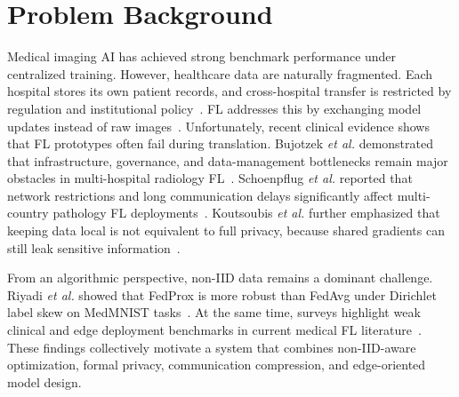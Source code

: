 \section{Problem Background}
Medical imaging AI has achieved strong benchmark performance under centralized
training. However, healthcare data are naturally fragmented. Each hospital
stores its own patient records, and cross-hospital transfer is restricted by
regulation and institutional policy~\cite{guan2024federated}. FL addresses
this by exchanging model updates instead of raw
images~\cite{mcmahan2017communication}. Unfortunately, recent clinical
evidence shows that FL prototypes often fail during translation. Bujotzek
\emph{et al.} demonstrated that infrastructure, governance, and
data-management bottlenecks remain major obstacles in multi-hospital
radiology FL~\cite{bujotzek2024real}. Schoenpflug \emph{et al.} reported
that network restrictions and long communication delays significantly affect
multi-country pathology FL deployments~\cite{schoenpflug2025navigating}.
Koutsoubis \emph{et al.} further emphasized that keeping data local is not
equivalent to full privacy, because shared gradients can still leak sensitive
information~\cite{koutsoubis2024future,wei2025medical}.

From an algorithmic perspective, non-IID data remains a dominant challenge.
Riyadi \emph{et al.} showed that FedProx is more robust than FedAvg under
Dirichlet label skew on MedMNIST tasks~\cite{riyadi2026comparative}. At the
same time, surveys highlight weak clinical and edge deployment benchmarks in
current medical FL literature~\cite{ghosh2026advancements,
zhou2025federated}. These findings collectively motivate a system that
combines non-IID-aware optimization, formal privacy, communication
compression, and edge-oriented model design.

